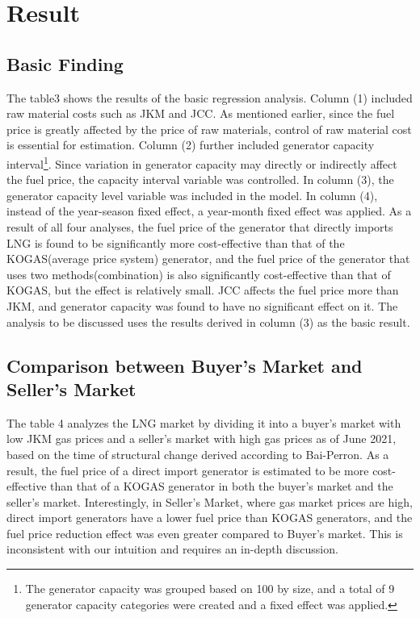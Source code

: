 \documentclass[12pt]{article}
\begin{document}
\newpage
\section{Result}

\subsection{Basic Finding}



The table3 shows the results of the basic regression analysis. Column (1) included raw material costs such as JKM and JCC. As mentioned earlier, since the fuel price is greatly affected by the price of raw materials, control of raw material cost is essential for estimation. Column (2) further included generator capacity interval\footnote{The generator capacity was grouped based on 100 by size, and a total of 9 generator capacity categories were created and a fixed effect was applied.}. Since variation in generator capacity may directly or indirectly affect the fuel price, the capacity interval variable was controlled. In column (3), the generator capacity level variable was included in the model. In column (4), instead of the year-season fixed effect, a year-month fixed effect was applied. 
As a result of all four analyses, the fuel price of the generator that directly imports LNG is found to be significantly more cost-effective than that of the KOGAS(average price system) generator, and the fuel price of the generator that uses two methods(combination) is also significantly cost-effective than that of KOGAS, but the effect is relatively small.
JCC affects the fuel price more than JKM, and generator capacity was found to have no significant effect on it. The analysis to be discussed uses the results derived in column (3) as the basic result.










\subsection{Comparison between Buyer's Market and Seller's Market}

The table 4 analyzes the LNG market by dividing it into a buyer's market with low JKM gas prices and a seller's market with high gas prices as of June 2021, based on the time of structural change derived according to Bai-Perron. As a result, the fuel price of a direct import generator is estimated to be more cost-effective than that of a KOGAS generator in both the buyer's market and the seller's market.
Interestingly, in Seller's Market, where gas market prices are high, direct import generators have a lower fuel price than KOGAS generators, and the fuel price reduction effect was even greater compared to Buyer's market. This is inconsistent with our intuition and requires an in-depth discussion.
\end{document}
